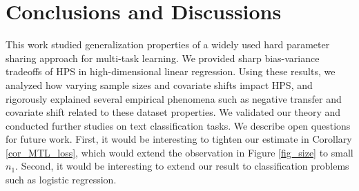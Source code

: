 \vspace{-0.06in}
\section{Conclusions and Discussions}\label{sec_conclude}
\vspace{-0.06in}

This work studied generalization properties of a widely used hard parameter sharing approach for multi-task learning.
We provided sharp bias-variance tradeoffs of HPS in high-dimensional linear regression.
Using these results, we analyzed how varying sample sizes and covariate shifts impact HPS, and rigorously explained several empirical phenomena such as negative transfer and covariate shift related to these dataset properties.
We validated our theory and conducted further studies on text classification tasks.
We describe open questions for future work.
First, it would be interesting to tighten our estimate in Corollary \ref{cor_MTL_loss}, which would extend the observation in Figure \ref{fig_size} to small $n_1$.
Second, it would be interesting to extend our result to classification problems such as logistic regression.
